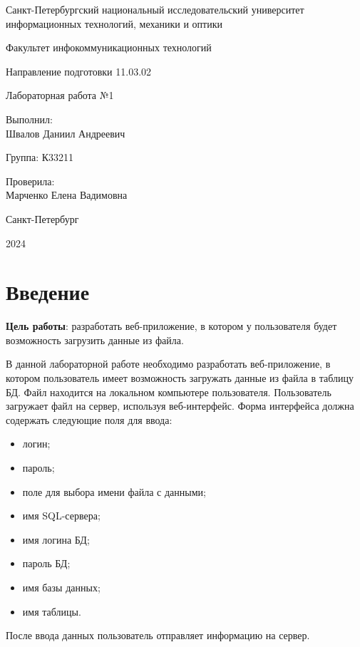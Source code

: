 \documentclass[a4paper, 14pt]{extarticle}
\begin{document}
\begin{titlepage}
  \vspace{0pt plus2fill}
  \noindent

  \vspace{0pt plus6fill}
  \begin{center}
    Санкт-Петербургский национальный исследовательский университет
    информационных технологий, механики и оптики

    \vspace{0pt plus3fill}

    Факультет инфокоммуникационных технологий

    Направление подготовки 11.03.02

    \vspace{0pt plus2fill}

    Лабораторная работа №1
  \end{center}

  \vspace{0pt plus6fill}
  \begin{flushright}
    Выполнил: \\
    Швалов Даниил Андреевич

    Группа: К33211

    Проверила: \\
    Марченко Елена Вадимовна
  \end{flushright}

  \vspace{0pt plus5fill}
  \begin{center}
    Санкт-Петербург

    2024
  \end{center}
\end{titlepage}

\section{Введение}

\textbf{Цель работы}: разработать веб-приложение, в котором у пользователя будет
возможность загрузить данные из файла.

В данной лабораторной работе необходимо разработать веб-приложение, в котором
пользователь имеет возможность загружать данные из файла в таблицу БД. Файл
находится на локальном компьютере пользователя. Пользователь загружает файл на
сервер, используя веб-интерфейс. Форма интерфейса должна содержать следующие
поля для ввода:
\begin{itemize}
  \item логин;
  \item пароль;
  \item поле для выбора имени файла с данными;
  \item имя SQL-сервера;
  \item имя логина БД;
  \item пароль БД;
  \item имя базы данных;
  \item имя таблицы.
\end{itemize}
После ввода данных пользователь отправляет информацию на сервер.
\end{document}
